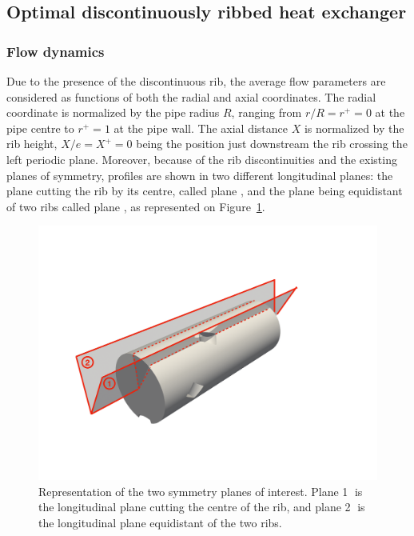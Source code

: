 \subsection{Optimal discontinuously ribbed heat exchanger}
\label{sec:optimal}
\subsubsection{Flow dynamics}

Due to the presence of the discontinuous rib, the average flow parameters are considered as functions of both the radial and axial coordinates. The radial coordinate is normalized by the pipe radius $R$, ranging from $r/R=r^+=0$ at the pipe centre to $r^+=1$ at the pipe wall. The axial distance $X$ is normalized by the rib height, $X/e=X^+=0$ being the position just downstream the rib crossing the left periodic plane. Moreover, because of the rib discontinuities and the existing planes of symmetry, profiles are shown in two different longitudinal planes: the plane cutting the rib by its centre, called plane , and the plane being equidistant of two ribs called plane , as represented on Figure~\ref{planes}.\\

\begin{figure}[!h]
\centering
\includegraphics[width=0.6\linewidth,keepaspectratio]{fig/applications/optim/PlaneS.pdf}
\caption{Representation of the two symmetry planes of interest. Plane \textcircled{1} is the longitudinal plane cutting the centre of the rib, and plane \textcircled{2} is the longitudinal plane equidistant of the two ribs.}
\label{planes}
\end{figure}

